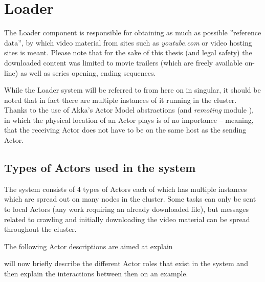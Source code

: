 \section{Loader}
\label{sec:loader-basics}
The Loader component is responsible for obtaining as much as possible ''reference data'', by which video material from sites such as \textit{youtube.com} or video hosting sites is meant. Please note that for the sake of this thesis (and legal safety) the downloaded content was limited to movie trailers (which are freely available on-line) as well as series opening, ending sequences.

While the Loader system will be referred to from here on in singular, it should be noted that in fact there are multiple instances of it running in the cluster. Thanks to the use of Akka's \cite{akka-docs} Actor Model abstractions (and \textit{remoting} module \cite{akka-remoting}), in which the physical location of an Actor plays is of no importance -- meaning, that the receiving Actor does not have to be on the same host as the sending Actor.

\subsection{Types of Actors used in the system}
\label{sec:types-of-actors}

The system consists of 4 types of Actors each of which has multiple instances which are spread out on many nodes in the cluster. Some tasks can only be sent to local Actors (any work requiring an already downloaded file), but messages related to crawling and initially downloading the video material can be spread throughout the cluster. 

The following Actor descriptions are aimed at explain

will now briefly describe the different Actor roles that exist in the system and then explain the interactions between then on an example.

